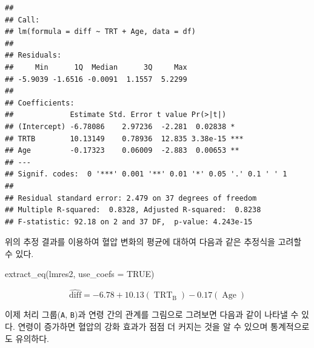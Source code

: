 \documentclass[
]{book}
\newenvironment{Shaded}{\begin{snugshade}}{\end{snugshade}}
\newcommand{\AttributeTok}[1]{\textcolor[rgb]{0.77,0.63,0.00}{#1}}
\newcommand{\ConstantTok}[1]{\textcolor[rgb]{0.00,0.00,0.00}{#1}}
\newcommand{\DecValTok}[1]{\textcolor[rgb]{0.00,0.00,0.81}{#1}}
\newcommand{\FunctionTok}[1]{\textcolor[rgb]{0.00,0.00,0.00}{#1}}
\newcommand{\NormalTok}[1]{#1}
\newcommand{\SpecialCharTok}[1]{\textcolor[rgb]{0.00,0.00,0.00}{#1}}
\newcommand{\StringTok}[1]{\textcolor[rgb]{0.31,0.60,0.02}{#1}}
\begin{document}
\begin{verbatim}
## 
## Call:
## lm(formula = diff ~ TRT + Age, data = df)
## 
## Residuals:
##     Min      1Q  Median      3Q     Max 
## -5.9039 -1.6516 -0.0091  1.1557  5.2299 
## 
## Coefficients:
##             Estimate Std. Error t value Pr(>|t|)    
## (Intercept) -6.78086    2.97236  -2.281  0.02838 *  
## TRTB        10.13149    0.78936  12.835 3.38e-15 ***
## Age         -0.17323    0.06009  -2.883  0.00653 ** 
## ---
## Signif. codes:  0 '***' 0.001 '**' 0.01 '*' 0.05 '.' 0.1 ' ' 1
## 
## Residual standard error: 2.479 on 37 degrees of freedom
## Multiple R-squared:  0.8328, Adjusted R-squared:  0.8238 
## F-statistic: 92.18 on 2 and 37 DF,  p-value: 4.243e-15
\end{verbatim}

위의 추정 결과를 이용하여 혈압 변화의 평균에 대하여 다음과 같은 추정식을 고려할 수 있다.

\begin{Shaded}
\begin{Highlighting}[]
\FunctionTok{extract\_eq}\NormalTok{(lmres2, }\AttributeTok{use\_coefs =} \ConstantTok{TRUE}\NormalTok{) }
\end{Highlighting}
\end{Shaded}

\[
\operatorname{\widehat{diff}} = -6.78 + 10.13(\operatorname{TRT}_{\operatorname{B}}) - 0.17(\operatorname{Age})
\]

이제 처리 그룹(\texttt{A}, \texttt{B})과 연령 간의 관계를 그림으로 그려보면 다음과 같이 나타낼 수 있다.
연령이 증가하면 혈압의 강화 효과가 점점 더 커지는 것을 알 수 있으며 통계적으로도 유의하다.

\begin{Shaded}
\end{Shaded}
\end{document}

